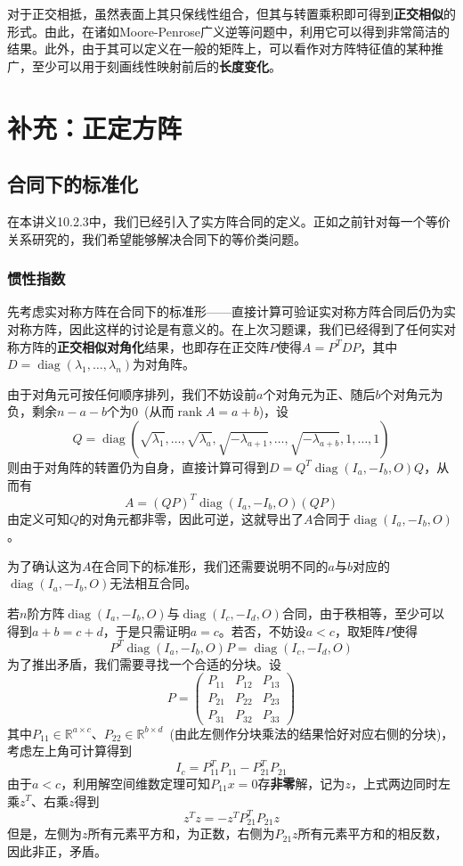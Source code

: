 \documentclass[a4paper,UTF8,fontset=windows]{ctexart}
\DeclareMathOperator{\diag}{diag}
\DeclareMathOperator{\rank}{rank}
\begin{document}
对于正交相抵，虽然表面上其只保线性组合，但其与转置乘积即可得到\textbf{正交相似}的形式。由此，在诸如Moore-Penrose广义逆等问题中，利用它可以得到非常简洁的结果。此外，由于其可以定义在一般的矩阵上，可以看作对方阵特征值的某种推广，至少可以用于刻画线性映射前后的\textbf{长度变化}。

\section{补充：正定方阵}
\subsection{合同下的标准化}
在本讲义10.2.3中，我们已经引入了实方阵合同的定义。正如之前针对每一个等价关系研究的，我们希望能够解决合同下的等价类问题。

\subsubsection{惯性指数}
先考虑实对称方阵在合同下的标准形——直接计算可验证实对称方阵合同后仍为实对称方阵，因此这样的讨论是有意义的。在上次习题课，我们已经得到了任何实对称方阵的\textbf{正交相似对角化}结果，也即存在正交阵$P$使得$A=P^TDP$，其中$D=\diag(\lambda_1,\dots,\lambda_n)$为对角阵。

由于对角元可按任何顺序排列，我们不妨设前$a$个对角元为正、随后$b$个对角元为负，剩余$n-a-b$个为0\ (从而$\rank A=a+b$)，设
$$Q=\diag(\sqrt{\lambda_1},\dots,\sqrt{\lambda_a},\sqrt{-\lambda_{a+1}},\dots,\sqrt{-\lambda_{a+b}},1,\dots,1)$$
则由于对角阵的转置仍为自身，直接计算可得到$D=Q^T\diag(I_a,-I_b,O)Q$，从而有
$$A=(QP)^T\diag(I_a,-I_b,O)(QP)$$
由定义可知$Q$的对角元都非零，因此可逆，这就导出了$A$合同于$\diag(I_a,-I_b,O)$。

为了确认这为$A$在合同下的标准形，我们还需要说明不同的$a$与$b$对应的$\diag(I_a,-I_b,O)$无法相互合同。

若$n$阶方阵$\diag(I_a,-I_b,O)$与$\diag(I_c,-I_d,O)$合同，由于秩相等，至少可以得到$a+b=c+d$，于是只需证明$a=c$。若否，不妨设$a<c$，取矩阵$P$使得
$$P^T\diag(I_a,-I_b,O)P=\diag(I_c,-I_d,O)$$
为了推出矛盾，我们需要寻找一个合适的分块。设
$$P=\begin{pmatrix}P_{11}&P_{12}&P_{13}\\P_{21}&P_{22}&P_{23}\\P_{31}&P_{32}&P_{33}\end{pmatrix}$$
其中$P_{11}\in\mathbb{R}^{a\times c}$、$P_{22}\in\mathbb{R}^{b\times d}$\ (由此左侧作分块乘法的结果恰好对应右侧的分块)，考虑左上角可计算得到
$$I_c=P_{11}^TP_{11}-P_{21}^TP_{21}$$
由于$a<c$，利用解空间维数定理可知$P_{11}x=0$存\textbf{非零}解，记为$z$，上式两边同时左乘$z^T$、右乘$z$得到
$$z^Tz=-z^TP_{21}^TP_{21}z$$
但是，左侧为$z$所有元素平方和，为正数，右侧为$P_{21}z$所有元素平方和的相反数，因此非正，矛盾。
\end{document}
